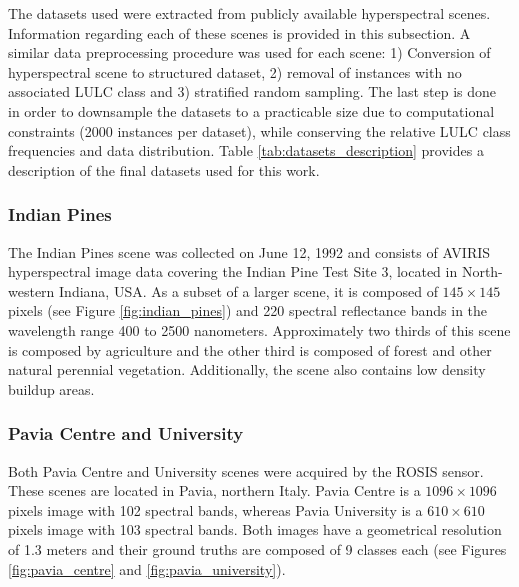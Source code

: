 \documentclass[parskip=full]{scrartcl}
\begin{document}
The datasets used were extracted from publicly available hyperspectral scenes.
Information regarding each of these scenes is provided in this subsection. A
similar data preprocessing procedure was used for each scene: 1) Conversion of
hyperspectral scene to structured dataset, 2) removal of instances with no
associated LULC class and 3) stratified random sampling. The last step is done
in order to downsample the datasets to a practicable size due to computational
constraints (2000 instances per dataset), while conserving the relative LULC
class frequencies and data distribution. Table \ref{tab:datasets_description} provides
a description of the final datasets used for this work.


\subsubsection*{Indian Pines}
The Indian Pines scene \cite{Baumgardner2015} was collected on June 12, 1992
and consists of AVIRIS hyperspectral image data covering the Indian Pine Test
Site 3, located in North-western Indiana, USA. As a subset of a larger scene,
it is composed of $145 \times 145$ pixels (see Figure
\ref{fig:indian_pines}) and 220 spectral reflectance bands in the wavelength
range 400 to 2500 nanometers. Approximately two thirds of this scene is
composed by agriculture and the other third is composed of forest and other
natural perennial vegetation. Additionally, the scene also contains low density
buildup areas.

\subsubsection*{Pavia Centre and University}
Both Pavia Centre and University scenes were acquired by the ROSIS sensor.
These scenes are located in Pavia, northern Italy. Pavia Centre is a
$1096 \times 1096$ pixels image with 102 spectral bands, whereas Pavia
University is a $610 \times 610$ pixels image with 103 spectral bands.
Both images have a geometrical resolution of 1.3 meters and their ground truths
are composed of 9 classes each (see Figures \ref{fig:pavia_centre} and
\ref{fig:pavia_university}).
\end{document}
